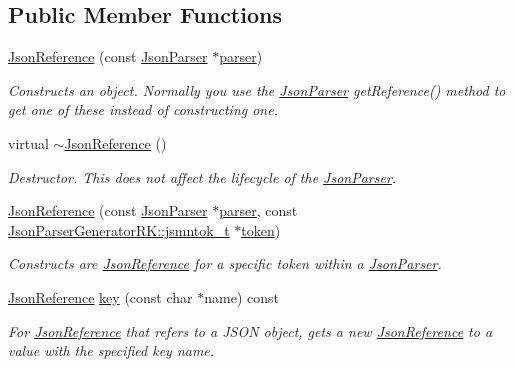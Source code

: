 \subsection*{Public Member Functions}
\begin{DoxyCompactItemize}
\item 
\hyperlink{class_json_reference_aa4d71b4a5c47270192b92b23b20ca149}{Json\+Reference} (const \hyperlink{class_json_parser}{Json\+Parser} $\ast$\hyperlink{class_json_reference_a37fb436fae63e7e452fc2325eddf3e8b}{parser})
\begin{DoxyCompactList}\small\item\em Constructs an object. Normally you use the \hyperlink{class_json_parser}{Json\+Parser} get\+Reference() method to get one of these instead of constructing one. \end{DoxyCompactList}\item 
virtual \hyperlink{class_json_reference_a4aca0aedf85a69c53d3af71baaee5030}{$\sim$\+Json\+Reference} ()
\begin{DoxyCompactList}\small\item\em Destructor. This does not affect the lifecycle of the \hyperlink{class_json_parser}{Json\+Parser}. \end{DoxyCompactList}\item 
\hyperlink{class_json_reference_a9b1d0b53240a31cd66918b76ffbfac61}{Json\+Reference} (const \hyperlink{class_json_parser}{Json\+Parser} $\ast$\hyperlink{class_json_reference_a37fb436fae63e7e452fc2325eddf3e8b}{parser}, const \hyperlink{struct_json_parser_generator_r_k_1_1jsmntok__t}{Json\+Parser\+Generator\+R\+K\+::jsmntok\+\_\+t} $\ast$\hyperlink{class_json_reference_a895a16fb8f781504fe39efd194ed5232}{token})
\begin{DoxyCompactList}\small\item\em Constructs are \hyperlink{class_json_reference}{Json\+Reference} for a specific token within a \hyperlink{class_json_parser}{Json\+Parser}. \end{DoxyCompactList}\item 
\hyperlink{class_json_reference}{Json\+Reference} \hyperlink{class_json_reference_abb7263eb5a84a137f0ed45631993d171}{key} (const char $\ast$name) const
\begin{DoxyCompactList}\small\item\em For \hyperlink{class_json_reference}{Json\+Reference} that refers to a J\+S\+ON object, gets a new \hyperlink{class_json_reference}{Json\+Reference} to a value with the specified key name. \end{DoxyCompactList}\item 

\end{DoxyCompactItemize}
